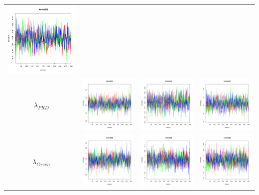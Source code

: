 \documentclass[letter,12pt]{article}
\begin{document}
\begin{table}
\begin{tabular}{cccc}
                         \includegraphics[width=.15\columnwidth]{../graphs/traceplots/2003d97wbar_2.pdf} \\
    $\lambda_{PRD}$   & \includegraphics[width=.15\columnwidth]{../graphs/traceplots/2003d97v_3.pdf} &
                        \includegraphics[width=.15\columnwidth]{../graphs/traceplots/2003d97vbar_3.pdf} &
                         \includegraphics[width=.15\columnwidth]{../graphs/traceplots/2003d97wbar_3.pdf} \\
    $\lambda_{Green}$  & \includegraphics[width=.15\columnwidth]{../graphs/traceplots/2003d97v_4.pdf} &
                        \includegraphics[width=.15\columnwidth]{../graphs/traceplots/2003d97vbar_4.pdf} &
                         \includegraphics[width=.15\columnwidth]{../graphs/traceplots/2003d97wbar_4.pdf} \\

\end{tabular}
\end{table}
\end{document}
